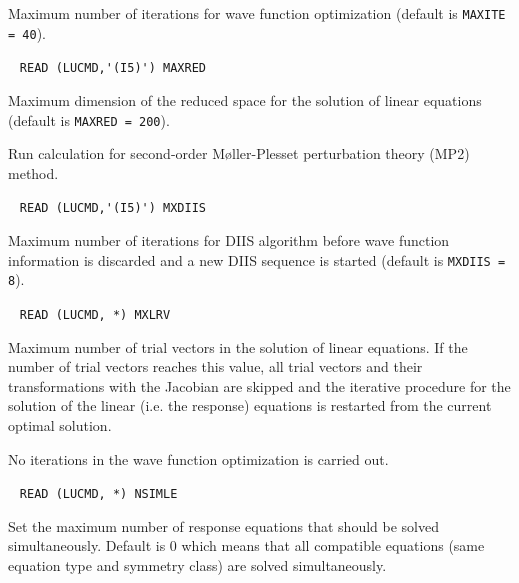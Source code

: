 \begin{description}
  Maximum number of iterations for wave function optimization 
  (default is \verb+MAXITE = 40+).
 
\item[\Key{MAXRED}] \verb| |\newline 
  \verb|READ (LUCMD,'(I5)') MAXRED|

  Maximum dimension of the reduced space for the 
  solution of linear equations (default is \verb+MAXRED = 200+).
 
%
%
\item[\Key{MP2   }]    
Run calculation for second-order M{\o}ller-Plesset perturbation theory
(MP2) method.

\item[\Key{MXDIIS}] \verb| |\newline
  \verb|READ (LUCMD,'(I5)') MXDIIS|

  Maximum number of iterations for DIIS algorithm
  before wave function information is discarded and a new DIIS 
  sequence is started
  (default is \verb+MXDIIS = 8+).
 
\item[\Key{MXLRV}] \verb| |\newline
  \verb|READ (LUCMD, *) MXLRV|

  Maximum number of trial vectors in the solution of 
  linear equations. If the number of trial vectors reaches this
  value, all trial vectors and their transformations with the
  Jacobian are skipped and the iterative procedure for the solution of the
  linear (i.e. the response) equations is restarted from the current 
  optimal solution. 
 
\item[\Key{NOCCIT}]
   No iterations in the wave function optimization is carried out.

\item[\Key{NSIMLE}] \verb| |\newline
  \verb|READ (LUCMD, *) NSIMLE|

  Set the maximum number of response equations that should be 
  solved simultaneously. Default is 0 which means that all
  compatible equations (same equation type and symmetry class) 
  are solved simultaneously.
 

\end{description}
